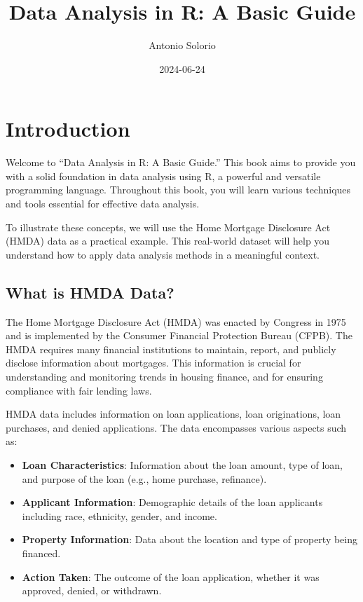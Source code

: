 \documentclass[
]{book}
\title{Data Analysis in R: A Basic Guide}
\author{Antonio Solorio}
\date{2024-06-24}
\providecommand{\tightlist}{%
  \setlength{\itemsep}{0pt}\setlength{\parskip}{0pt}}
\begin{document}
\maketitle

{
\setcounter{tocdepth}{1}
\tableofcontents
}
\chapter{Introduction}\label{introduction}

Welcome to ``Data Analysis in R: A Basic Guide.'' This book aims to provide you with a solid foundation in data analysis using R, a powerful and versatile programming language. Throughout this book, you will learn various techniques and tools essential for effective data analysis.

To illustrate these concepts, we will use the Home Mortgage Disclosure Act (HMDA) data as a practical example. This real-world dataset will help you understand how to apply data analysis methods in a meaningful context.

\section{What is HMDA Data?}\label{what-is-hmda-data}

The Home Mortgage Disclosure Act (HMDA) was enacted by Congress in 1975 and is implemented by the Consumer Financial Protection Bureau (CFPB). The HMDA requires many financial institutions to maintain, report, and publicly disclose information about mortgages. This information is crucial for understanding and monitoring trends in housing finance, and for ensuring compliance with fair lending laws.

HMDA data includes information on loan applications, loan originations, loan purchases, and denied applications. The data encompasses various aspects such as:

\begin{itemize}
\tightlist
\item
  \textbf{Loan Characteristics}: Information about the loan amount, type of loan, and purpose of the loan (e.g., home purchase, refinance).
\item
  \textbf{Applicant Information}: Demographic details of the loan applicants including race, ethnicity, gender, and income.
\item
  \textbf{Property Information}: Data about the location and type of property being financed.
\item
  \textbf{Action Taken}: The outcome of the loan application, whether it was approved, denied, or withdrawn.
\end{itemize}
\end{document}
